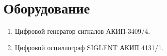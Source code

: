 \section*{Оборудование}

\begin{enumerate}
	\item Цифровой генератор сигналов АКИП-3409/4.
	
	\item Цифровой осциллограф SIGLENT АКИП 4131/1.
\end{enumerate}